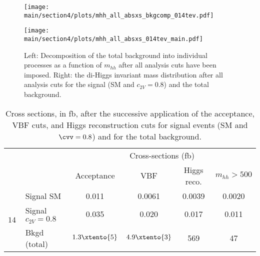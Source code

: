 \begin{figure}[h!]
	\centering
	\begin{minipage}{0.49\textwidth}\centering
		\texttt{[image: \\main/section4/plots/mhh\_all\_absxs\_bkgcomp\_014tev.pdf]}
	\end{minipage}
	\begin{minipage}{0.49\textwidth}\centering
		\texttt{[image: \\main/section4/plots/mhh\_all\_absxs\_014tev\_main.pdf]}
	\end{minipage}
	\caption{\small Left: Decomposition of the total
		background into individual processes as a function of $m_{hh}$
		after all analysis cuts have been imposed.
		Right: the di-Higgs invariant mass distribution after all analysis cuts
		for the signal (SM and $c_{2V}=0.8$) and the total background.
	}
	\label{fig:mhhdist} 
\end{figure}

\begin{table}[h]\centering
	\small
	\renewcommand{\arraystretch}{1.5}
	\begin{tabular}{llcccc}
		\toprule[0.1em]
		& & \multicolumn{4}{c}{Cross-sections (fb) } \\
		&  &  Acceptance & VBF  & Higgs reco. & $m_{hh}>500$ \UGeV  \\\midrule 
		\multirow{3}{*}{	{\large $14\,$\UTeV}} 
		& Signal SM &  0.011 & 0.0061 & 0.0039 & 0.0020 \\
		& Signal $c_{2V}=0.8$ & 0.035 & 0.020 & 0.017 & 0.011 \\
		& Bkgd (total)   & $1.3\xtento{5}$ & $4.9\xtento{3}$ & 569 & 47   \\
		\bottomrule[0.1em]
	\end{tabular} 
	\caption{\small Cross sections, in fb, after the
		successive application of the acceptance, VBF cuts, and Higgs reconstruction cuts
		for signal events (SM and  $\cvv=0.8$) and for
		the total background. \label{tab:xsecs}
	}
\end{table}

